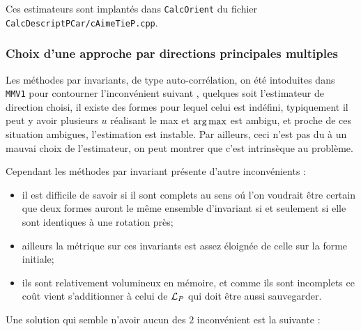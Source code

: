 Ces estimateurs sont implant\'es dans {\tt CalcOrient} du fichier {\tt CalcDescriptPCar/cAimeTieP.cpp}.


\subsubsection{Choix d'une approche par directions principales multiples}

Les m\'ethodes par invariants, de type auto-corr\'elation, on \'et\'e intoduites dans {\tt MMV1}
pour contourner l'inconv\'enient suivant , quelques soit l'estimateur de direction choisi, il existe des formes
pour lequel celui est ind\'efini, typiquement il peut y avoir plusieurs $u$ r\'ealisant le max et $\operatorname*{arg\,max}$
est ambigu, et proche de ces situation ambigues, l'estimation est instable.
Par ailleurs, ceci n'est pas du \`a un mauvai choix de l'estimateur, on peut montrer que c'est intrins\`eque
au probl\`eme.


Cependant les m\'ethodes par invariant pr\'esente d'autre inconv\'enients :

\begin{itemize}
   \item il est difficile de savoir si il sont complets au sens o\'u l'on voudrait \^etre certain
         que deux formes auront le  m\^eme ensemble d'invariant si et seulement si elle sont identiques
         \`a une rotation pr\`es;

   \item ailleurs la m\'etrique sur ces invariants est assez \'eloign\'ee de celle sur la forme initiale;

   \item  ils sont relativement  volumineux en m\'emoire, et comme ils sont incomplets ce co\^ut vient
          s'additionner  \`a celui de ${\mathcal L_P}$ qui  doit \^etre aussi sauvegarder.
\end{itemize}


Une solution qui semble n'avoir aucun des $2$ inconv\'enient est la suivante :

